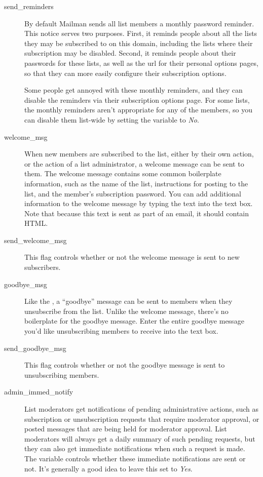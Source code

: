 \documentclass{howto}
\begin{document}
\begin{description}
\item[send_reminders]
    By default Mailman sends all list members a monthly password
    reminder.  This notice serves two purposes.  First, it reminds
    people about all the lists they may be subscribed to on this
    domain, including the lists where their subscription may be
    disabled.  Second, it reminds people about their passwords for
    these lists, as well as the url for their personal options pages,
    so that they can more easily configure their subscription options.

    Some people get annoyed with these monthly reminders, and they can
    disable the reminders via their subscription options page.  For
    some lists, the monthly reminders aren't appropriate for any of
    the members, so you can disable them list-wide by setting the
     variable to \emph{No}.

\item[welcome_msg]
    When new members are subscribed to the list, either by their own
    action, or the action of a list administrator, a welcome message
    can be sent to them.  The welcome message contains some common
    boilerplate information, such as the name of the list,
    instructions for posting to the list, and the member's
    subscription password.  You can add additional information to the
    welcome message by typing the text into the 
    text box.  Note that because this text is sent as part of an
    email, it should  contain HTML.

\item[send_welcome_msg]
    This flag controls whether or not the welcome message is sent to
    new subscribers.

\item[goodbye_msg]
    Like the , a ``goodbye'' message can be sent to
    members when they unsubscribe from the list.  Unlike the welcome
    message, there's no boilerplate for the goodbye message.  Enter
    the entire goodbye message you'd like unsubscribing members to
    receive into the  text box.

\item[send_goodbye_msg]
    This flag controls whether or not the goodbye message is sent to
    unsubscribing members.

\item[admin_immed_notify]
    List moderators get notifications of pending administrative
    actions, such as subscription or unsubscription requests that
    require moderator approval, or posted messages that are being held
    for moderator approval.  List moderators will always get a daily
    summary of such pending requests, but they can also get immediate
    notifications when such a request is made.  The
     variable controls whether these
    immediate notifications are sent or not.  It's generally a good
    idea to leave this set to \emph{Yes}.


\end{description}
\end{document}
